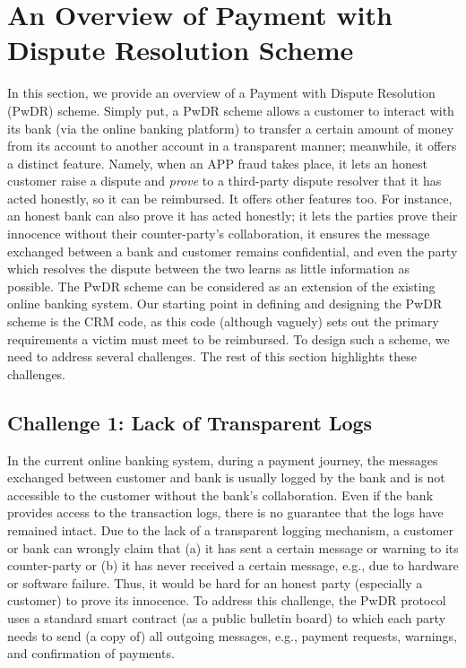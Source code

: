 

\section{An Overview of Payment with Dispute Resolution Scheme}

In this section, we provide an overview of a Payment with Dispute Resolution (PwDR) scheme. Simply put, a PwDR scheme  allows a customer to interact with its bank (via the online banking platform) to transfer a certain amount of money from its account to another account in a transparent manner; meanwhile, it  offers a distinct  feature. Namely, when an APP fraud takes place, it lets an honest customer raise a dispute and \emph{prove} to a third-party dispute resolver that it has acted honestly, so it can be reimbursed. It offers other features too. For instance,  an honest bank can also prove it has acted honestly; it lets the parties prove their innocence  without their counter-party's collaboration,  it  ensures the message exchanged between a bank and customer remains confidential, and even the party which resolves the dispute between the two learns as little information as possible.  The PwDR scheme can be considered as an extension of the existing   online banking system. Our starting point in defining and  designing the PwDR scheme is the CRM code, as this code (although vaguely) sets out the primary requirements a victim must meet to be reimbursed.  To design such a scheme, we need to address  several challenges. The rest of this section  highlights these challenges. 




\subsection{Challenge 1: Lack of Transparent Logs} 
In the current online  banking system, during a payment journey, the messages exchanged between customer and bank is usually logged by the bank and is not accessible to the customer without the bank's collaboration. Even if the bank provides access to the transaction logs, there is no guarantee that the logs have remained intact. Due to the lack of a transparent logging mechanism, a customer or bank can wrongly claim that (a) it has sent a certain message or warning to its counter-party or (b) it has never  received a certain message, e.g., due to hardware or software failure.  Thus, it would be hard for an honest party (especially a customer) to prove its innocence. To address this challenge, the PwDR protocol uses a standard smart contract (as a public bulletin board) to which  each party needs to send (a copy of) all outgoing messages, e.g., payment requests, warnings, and  confirmation of payments. 




